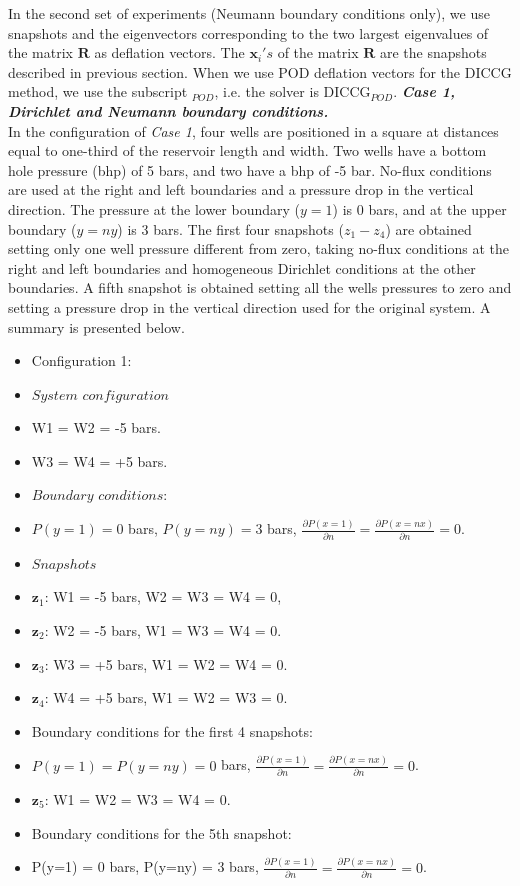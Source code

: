 \documentclass{ecmorXV}
\begin{document}
In the second set of experiments (Neumann boundary conditions only), we use snapshots and the eigenvectors
corresponding to the two largest eigenvalues of the matrix $\mathbf{R}$ as deflation vectors.
The $\mathbf{x}_i's$ of the matrix $\mathbf{R}$ are the 
snapshots described in previous section. When we use POD deflation vectors for the DICCG method, 
we use the subscript $_{POD}$, i.e. the solver is DICCG$_{POD}$. 
\newpage
\textbf{\emph{Case 1, Dirichlet and Neumann boundary conditions.}}\\
In the configuration of \emph{Case 1}, four wells are positioned in a square at distances equal 
to one-third of the reservoir length and width. Two wells have a bottom hole pressure (bhp) of 5 bars, and two have 
a bhp of -5 bar. No-flux conditions are used at the right and left boundaries and a pressure drop
in the vertical direction. The pressure at the lower boundary ($y=1$) is 0 bars, and at
the upper boundary ($y=ny$) is 3 bars. 
The first four snapshots ($z_1-z_4$) are obtained setting only one well pressure
different from zero, taking no-flux conditions at the right and left boundaries and 
homogeneous Dirichlet conditions at the other boundaries. A fifth snapshot is obtained 
setting all the wells pressures to zero and setting a pressure drop in the vertical 
direction used for the
original system. 
A summary is presented below.
\begin{itemize}
\item[] Configuration 1:
\item[]  $System$ $configuration$ 
 \item[]  W1 =  W2 = -5 bars.
 \item[] W3 = W4 = +5 bars.
\item[] $Boundary$ $conditions:$
\item[] $P(y=1) = 0$ bars, $P(y=ny) = 3$ bars, $\frac{\partial P(x=1)}{\partial n}=\frac{\partial P(x=nx)}{\partial n}=0$.
\item[]  $Snapshots$ 
 \item[] $\mathbf{z}_1$: W1 = -5 bars, W2 = W3 = W4 = 0, 
\item[] $\mathbf{z}_2$: W2 = -5 bars, W1 = W3 = W4 = 0.
\item[] $\mathbf{z}_3$: W3 = +5 bars, W1 = W2 = W4 = 0.
\item[] $\mathbf{z}_4$: W4 = +5 bars, W1 = W2 = W3 = 0.
\item[] Boundary conditions for the first 4 snapshots: 
\item[] $P(y=1) =  P(y=ny) = 0$ bars, $\frac{\partial P(x=1)}{\partial n}=\frac{\partial P(x=nx)}{\partial n}=0$.
 \item[] $\mathbf{z}_5$: W1 =  W2 =  W3 = W4 = 0.
 \item[] Boundary conditions for the 5th snapshot: 
\item[] P(y=1) = 0 bars, P(y=ny) = 3 bars, $\frac{\partial P(x=1)}{\partial n}=\frac{\partial P(x=nx)}{\partial n}=0$.
\end{itemize}
\end{document}
